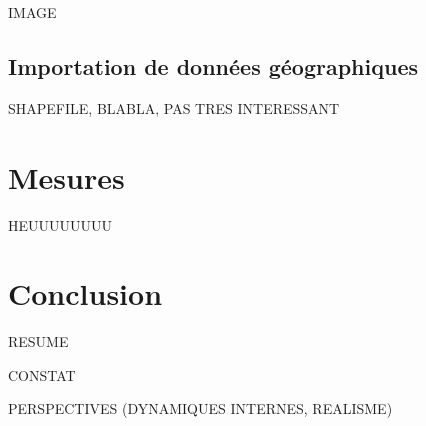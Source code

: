 \documentclass[12pt]{article}
\begin{document}
IMAGE

\subsection{Importation de données géographiques}

SHAPEFILE, BLABLA, PAS TRES INTERESSANT

\section{Mesures}

HEUUUUUUUU

\section{Conclusion}

RESUME

CONSTAT

PERSPECTIVES (DYNAMIQUES INTERNES, REALISME)

\printbibliography
\end{document}
